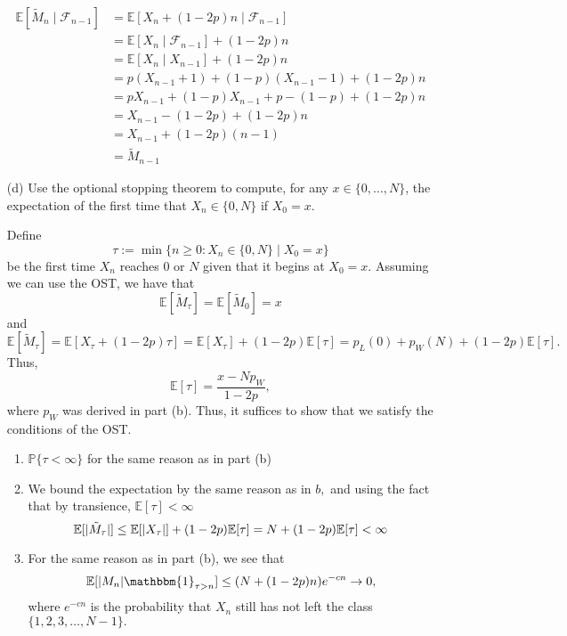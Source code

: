 \documentclass[11pt]{article}
\newcommand{\bbE}{\mathbb{E}}
\newcommand{\bbP}{\mathbb{P}}
\begin{document}
\begin{itemize}
\begin{solution}
        \begin{align*}
            \bbE[\widetilde{M}_n \mid \mathcal{F}_{n-1}]&= \bbE[X_n + (1-2p)n \mid \mathcal{F}_{n-1}]\\
            &= \bbE[X_n\mid \mathcal{F}_{n-1}] + (1-2p)n\\
            &= \bbE[X_n\mid {X}_{n-1}] + (1-2p)n\\
            &= p(X_{n-1} +1) + (1-p)(X_{n-1} - 1) + (1-2p)n\\
            &= pX_{n-1} + (1-p)X_{n-1} + p - (1-p) + (1-2p)n\\
            &= X_{n-1} -(1 - 2p) + (1-2p)n\\
            &= X_{n-1} + (1-2p)(n-1)\\
            &= \widetilde{M}_{n-1}
        \end{align*}
    \end{solution}
    \item[(d)] Use the optional stopping theorem to compute, for any \(x \in \{0, \ldots, N\}\), the expectation of the first time that \(X_n \in \{0, N\}\) if \(X_0 = x\).
    \begin{solution}
        Define
        \[\tau:= \min\{ n \geq 0 : X_n \in \{0, N\} \mid X_0 = x\}\] be the first time $X_n$ reaches $0$ or $N$ given that it begins at $X_0 = x.$ Assuming we can use the OST, we have that 
        \[\bbE[\widetilde{M}_\tau] = \bbE[\widetilde{M}_0] = x\] and 
        \[\bbE[\widetilde{M}_\tau] = \bbE[X_\tau + (1-2p)\tau] = \bbE[X_\tau]+ (1-2p)\bbE[\tau] = p_L(0) + p_W(N) + (1-2p)\bbE[\tau].\]
        Thus, 
        \[\bbE[\tau] = \frac{x- Np_W}{1-2p},\] where $p_W$ was derived in part (b). Thus, it suffices to show that we satisfy the conditions of the OST.
        \begin{enumerate}
            \item $\bbP\{\tau <\infty\}$ for the same reason as in part (b)
            \item We bound the expectation by the same reason as in $b,$ and using the fact that by transience, $\bbE[\tau] < \infty$
            \[\bbE[|\Tilde{M}_\tau|] \leq \bbE[|X_\tau|] + (1-2p)\bbE[\tau] = N + (1-2p)\bbE[\tau] < \infty\]
            \item For the same reason as in part (b), we see that 
            \[\bbE[|M_n| \mathbbm{1}_{\tau >n}] \leq (N + (1-2p)n)e^{-cn} \to 0,\] where $e^{-cn}$ is the probability that $X_n$ still has not left the class $\{1,2,3,\dots, N-1\}.$
        \end{enumerate}
    \end{solution}
\end{itemize}
\end{document}
